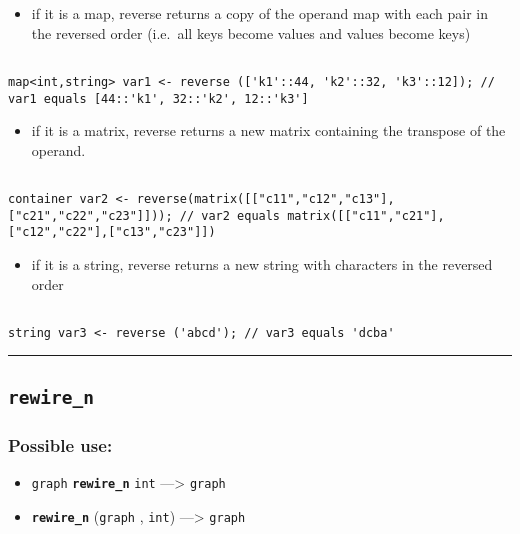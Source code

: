 \documentclass[]{book}
\providecommand{\tightlist}{%
  \setlength{\itemsep}{0pt}\setlength{\parskip}{0pt}}
\theoremstyle{definition}
\theoremstyle{definition}
\theoremstyle{definition}
\theoremstyle{remark}
\begin{document}
\begin{itemize}
\tightlist
\item
  if it is a map, reverse returns a copy of the operand map with each
  pair in the reversed order (i.e.~all keys become values and values
  become keys)
\end{itemize}

\begin{verbatim}
 
map<int,string> var1 <- reverse (['k1'::44, 'k2'::32, 'k3'::12]); // var1 equals [44::'k1', 32::'k2', 12::'k3']
\end{verbatim}

\begin{itemize}
\tightlist
\item
  if it is a matrix, reverse returns a new matrix containing the
  transpose of the operand.
\end{itemize}

\begin{verbatim}
 
container var2 <- reverse(matrix([["c11","c12","c13"],["c21","c22","c23"]])); // var2 equals matrix([["c11","c21"],["c12","c22"],["c13","c23"]])
\end{verbatim}

\begin{itemize}
\tightlist
\item
  if it is a string, reverse returns a new string with characters in the
  reversed order
\end{itemize}

\begin{verbatim}
 
string var3 <- reverse ('abcd'); // var3 equals 'dcba'
\end{verbatim}

\begin{center}\rule{0.5\linewidth}{\linethickness}\end{center}

\subsection{\texorpdfstring{\texttt{rewire\_n}}{rewire\_n}}\label{rewire_n}

\subsubsection{Possible use:}\label{possible-use-436}

\begin{itemize}
\tightlist
\item
  \texttt{graph} \textbf{\texttt{rewire\_n}} \texttt{int}
  ---\textgreater{} \texttt{graph}
\item
  \textbf{\texttt{rewire\_n}} (\texttt{graph} , \texttt{int})
  ---\textgreater{} \texttt{graph}
\end{itemize}
\end{document}
